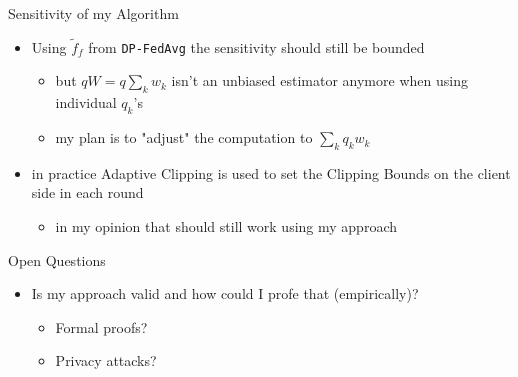 \documentclass[aspectratio=169]{beamer}
\begin{document}
\begin{frame}{Sensitivity of my Algorithm}
    \begin{itemize}
        \item Using $\tilde{f}_f$ from \texttt{DP-FedAvg} the sensitivity should still be bounded
        \begin{itemize}
            \item but $qW = q \sum_{k}w_k$ isn't an unbiased estimator anymore when using individual $q_k$'s
            \item my plan is to "adjust" the computation to $\sum_k q_k w_k$
        \end{itemize}
        \item in practice Adaptive Clipping \parencite{andrew:2021} is used to set the Clipping Bounds on the client side in each round
        \begin{itemize}
            \item in my opinion that should still work using my approach
        \end{itemize}
    \end{itemize}
\end{frame}


\begin{frame}{Open Questions}
    \begin{itemize}
        \item Is my approach valid and how could I profe that (empirically)?
        \begin{itemize}
            \item Formal proofs?
            \item Privacy attacks?
        \end{itemize}
    \end{itemize}
\end{frame}
\end{document}
